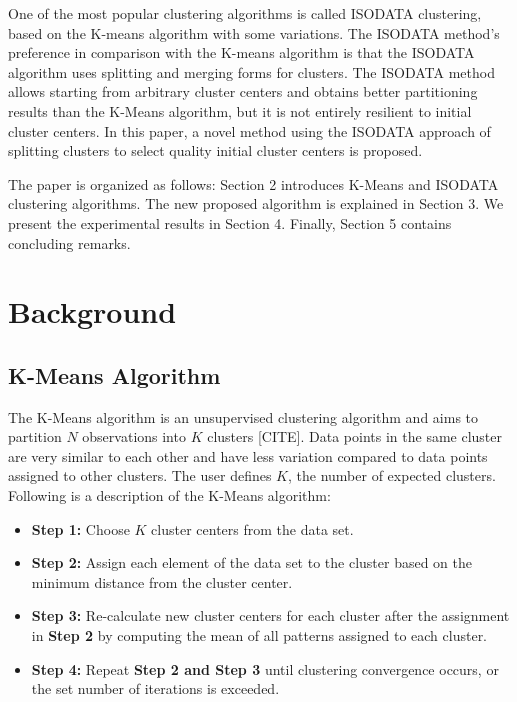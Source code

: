 \documentclass[a4paper,10pt]{article}
\begin{document}
One of the most popular clustering algorithms is called ISODATA clustering,
based on the K-means algorithm with some variations. The ISODATA method's
preference in comparison with the K-means algorithm is that the ISODATA
algorithm uses splitting and merging forms for clusters. The ISODATA method
allows starting from arbitrary cluster centers and obtains better partitioning
results than the K-Means algorithm, but it is not entirely resilient to initial
cluster centers. In this paper, a novel method using the ISODATA approach of
splitting clusters to select quality initial cluster centers is proposed.

The paper is organized as follows: Section 2 introduces K-Means and ISODATA
clustering algorithms. The new proposed algorithm is explained in Section 3. We
present the experimental results in Section 4. Finally, Section 5 contains
concluding remarks.


\section{Background}

\subsection{K-Means Algorithm}

The K-Means algorithm is an unsupervised clustering algorithm and aims to
partition $N$ observations into $K$ clusters [CITE]. Data points in the same
cluster are very similar to each other and have less variation compared to data
points assigned to other clusters. The user defines $K$, the number of expected
clusters. Following is a description of the K-Means algorithm:

\begin{itemize}
      \item \textbf{Step 1:} Choose $K$ cluster centers from the data set.
      \item \textbf{Step 2:} Assign each element of the data set to the cluster
            based on the minimum distance from the cluster center.
      \item \textbf{Step 3:} Re-calculate new cluster centers for each cluster
            after the assignment in \textbf{Step 2} by computing the mean of all
            patterns assigned to each cluster.
      \item \textbf{Step 4:} Repeat \textbf{Step 2 and Step 3} until clustering
            convergence occurs, or the set number of iterations is exceeded.
\end{itemize}
\end{document}

